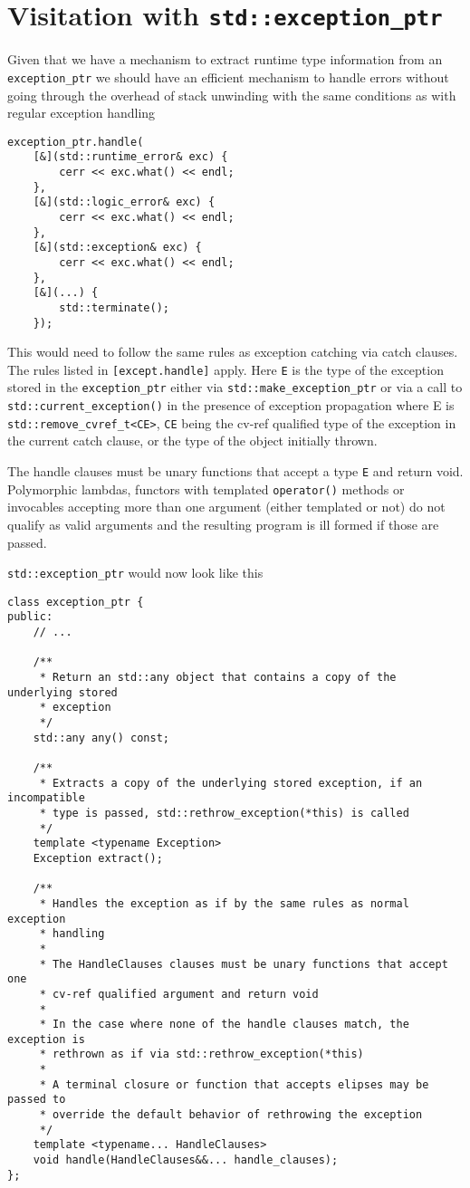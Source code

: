 \documentclass{article}
\begin{document}
\section{Visitation with \texttt{std::exception\_ptr}}
Given that we have a mechanism to extract runtime type information from an
\texttt{exception\_ptr} we should have an efficient mechanism to handle errors
without going through the overhead of stack unwinding with the same conditions
as with regular exception handling
\begin{lstlisting}
exception_ptr.handle(
    [&](std::runtime_error& exc) {
        cerr << exc.what() << endl;
    },
    [&](std::logic_error& exc) {
        cerr << exc.what() << endl;
    },
    [&](std::exception& exc) {
        cerr << exc.what() << endl;
    },
    [&](...) {
        std::terminate();
    });
\end{lstlisting}

This would need to follow the same rules as exception catching via catch
clauses.  The rules listed in \texttt{[except.handle]} apply.  Here \texttt{E}
is the type of the exception stored in the \texttt{exception\_ptr} either via
\texttt{std::make\_exception\_ptr} or via a call to
\texttt{std::current\_exception()} in the presence of exception propagation
where E is \texttt{std::remove\_cvref\_t<CE>}, \texttt{CE} being the cv-ref
qualified type of the exception in the current catch clause, or the type of
the object initially thrown.

The handle clauses must be unary functions that accept a type \texttt{E} and
return void.  Polymorphic lambdas, functors with templated \texttt{operator()}
methods or invocables accepting more than one argument (either templated or
not) do not qualify as valid arguments and the resulting program is ill formed
if those are passed.

\texttt{std::exception\_ptr} would now look like this
\begin{lstlisting}
class exception_ptr {
public:
    // ...

    /**
     * Return an std::any object that contains a copy of the underlying stored
     * exception
     */
    std::any any() const;

    /**
     * Extracts a copy of the underlying stored exception, if an incompatible
     * type is passed, std::rethrow_exception(*this) is called
     */
    template <typename Exception>
    Exception extract();

    /**
     * Handles the exception as if by the same rules as normal exception
     * handling
     *
     * The HandleClauses clauses must be unary functions that accept one
     * cv-ref qualified argument and return void
     *
     * In the case where none of the handle clauses match, the exception is
     * rethrown as if via std::rethrow_exception(*this)
     *
     * A terminal closure or function that accepts elipses may be passed to
     * override the default behavior of rethrowing the exception
     */
    template <typename... HandleClauses>
    void handle(HandleClauses&&... handle_clauses);
};
\end{lstlisting}
\end{document}
